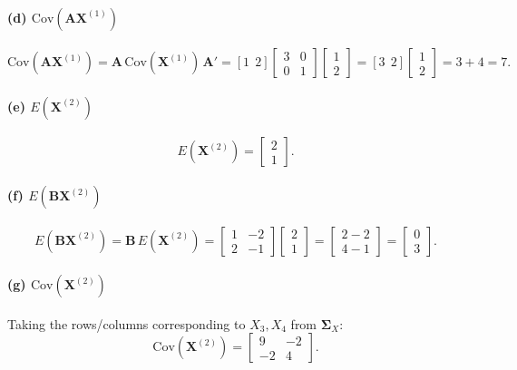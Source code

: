 \documentclass[11pt]{article}
\newcommand{\bA}{\mathbf{A}}
\newcommand{\bB}{\mathbf{B}}
\newcommand{\bX}{\mathbf{X}}
\newcommand{\bSigma}{\boldsymbol{\Sigma}}
\begin{document}
\paragraph{(d) $\mathrm{Cov}(\bA\bX^{(1)})$}
\[
\mathrm{Cov}(\bA\bX^{(1)}) = \bA\,\mathrm{Cov}(\bX^{(1)})\,\bA'
= [1\ \ 2]\begin{bmatrix} 3&0\\0&1 \end{bmatrix}\begin{bmatrix} 1\\2 \end{bmatrix}
= [3\ \ 2]\begin{bmatrix} 1\\2 \end{bmatrix} = 3+4 = 7.
\]

\paragraph{(e) $E(\bX^{(2)})$}
\[
E(\bX^{(2)}) = \begin{bmatrix} 2 \\ 1 \end{bmatrix}.
\]

\paragraph{(f) $E(\bB\bX^{(2)})$}
\[
E(\bB\bX^{(2)}) = \bB\,E(\bX^{(2)}) = \begin{bmatrix} 1 & -2 \\ 2 & -1 \end{bmatrix}\begin{bmatrix} 2\\1 \end{bmatrix}
= \begin{bmatrix} 2-2 \\ 4-1 \end{bmatrix} = \begin{bmatrix} 0 \\ 3 \end{bmatrix}.
\]

\paragraph{(g) $\mathrm{Cov}(\bX^{(2)})$}
Taking the rows/columns corresponding to $X_3, X_4$ from $\bSigma_X$:
\[
\mathrm{Cov}(\bX^{(2)}) = \begin{bmatrix} 9 & -2 \\ -2 & 4 \end{bmatrix}.
\]
\end{document}
